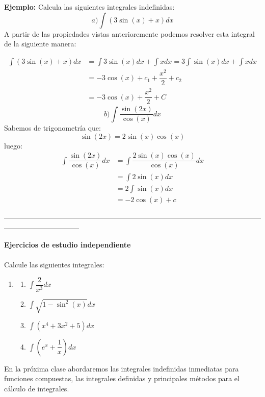 \documentclass{article}
\begin{document}
{\bf Ejemplo:} Calcula las siguientes integrales indefinidas:
$$a) \displaystyle \int (3\sin(x)+x)dx$$
A partir de las propiedades vistas anterioremente podemos resolver esta integral de la siguiente manera:

\begin{align*}
	\int (3\sin(x)+x)dx&=\int 3\sin(x)dx+\int xdx=3\int\sin(x)dx+\int xdx\\
	&=-3\cos(x)+c_1+\dfrac{x^2}{2}+c_2\\
	&=-3\cos(x)+\dfrac{x^2}{2}+C
\end{align*}
$$b) \displaystyle \int \dfrac{\sin(2x)}{\cos(x)}dx$$
Sabemos de trigonometría que:
$$\sin(2x)=2\sin(x)\cos(x)$$
luego:
\begin{align*}
	\int \dfrac{\sin(2x)}{\cos(x)}dx&=\int\dfrac{2\sin(x)\cos(x)}{\cos(x)}dx\\
	&=\int2\sin(x)dx\\
	&=2\int\sin(x)dx\\
	&=-2\cos(x)+c
\end{align*}
\begin{center}
	{\color{uprgreen}--------------------------------------------------------------------------------------------------------------------------------------------}
\end{center}

{\bf Ejercicios de estudio independiente}\\ \\
Calcule las siguientes integrales:
\begin{enumerate}
	\item[]
	\begin{enumerate}
		\item $\displaystyle \int\dfrac{2}{x^3}dx$
		\item $\displaystyle \int\sqrt{1-\sin^2(x)}dx$
		\item $\displaystyle \int (x^4+3x^2+5)dx$
		\item $\displaystyle \int \left(e^x+\dfrac{1}{x}\right)dx$
	\end{enumerate}
\end{enumerate}

En la próxima clase abordaremos las integrales indefinidas inmediatas para funciones compuestas, las integrales definidas y principales métodos para el cálculo de integrales.
\end{document}
